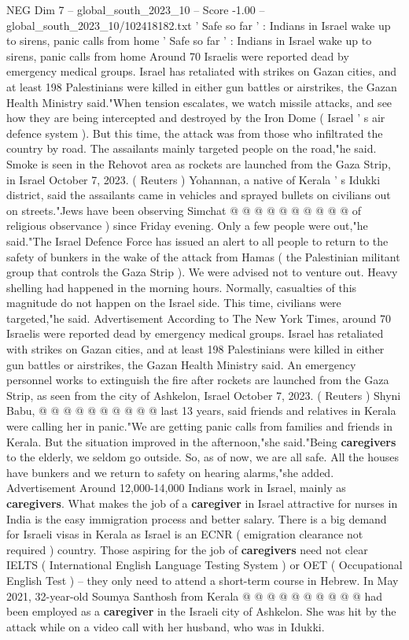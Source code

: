 \begin{textsample}{NEG Dim 7 – global\_south\_2023\_10 – Score -1.00 – global\_south\_2023\_10/102418182.txt}  \label{ex:f7_neg_070}
' Safe so far ' : Indians in Israel wake up to sirens, panic calls from home ' Safe so far ' : Indians in Israel wake up to sirens, panic calls from home Around 70 Israelis were reported dead by emergency medical groups.
Israel has retaliated with strikes on Gazan cities, and at least 198 Palestinians were killed in either gun battles or airstrikes, the Gazan Health Ministry said."When tension escalates, we watch missile attacks, and see how they are being intercepted and destroyed by the Iron Dome ( Israel ' s air defence system ).
But this time, the attack was from those who infiltrated the country by road.
The assailants mainly targeted people on the road,"he said.
Smoke is seen in the Rehovot area as rockets are launched from the Gaza Strip, in Israel October 7, 2023. ( Reuters ) Yohannan, a native of Kerala ' s Idukki district, said the assailants came in vehicles and sprayed bullets on civilians out on streets."Jews have been observing Simchat @ @ @ @ @ @ @ @ @ @ of religious observance ) since Friday evening.
Only a few people were out,"he said."The Israel Defence Force has issued an alert to all people to return to the safety of bunkers in the wake of the attack from Hamas ( the Palestinian militant group that controls the Gaza Strip ).
We were advised not to venture out.
Heavy shelling had happened in the morning hours.
Normally, casualties of this magnitude do not happen on the Israel side.
This time, civilians were targeted,"he said.
Advertisement According to The New York Times, around 70 Israelis were reported dead by emergency medical groups.
Israel has retaliated with strikes on Gazan cities, and at least 198 Palestinians were killed in either gun battles or airstrikes, the Gazan Health Ministry said.
An emergency personnel works to extinguish the fire after rockets are launched from the Gaza Strip, as seen from the city of Ashkelon, Israel October 7, 2023. ( Reuters ) Shyni Babu, @ @ @ @ @ @ @ @ @ @ last 13 years, said friends and relatives in Kerala were calling her in panic."We are getting panic calls from families and friends in Kerala.
But the situation improved in the afternoon,"she said."Being \textbf{caregivers} to the elderly, we seldom go outside.
So, as of now, we are all safe.
All the houses have bunkers and we return to safety on hearing alarms,"she added.
Advertisement Around 12,000-14,000 Indians work in Israel, mainly as \textbf{caregivers}.
What makes the job of a \textbf{caregiver} in Israel attractive for nurses in India is the easy immigration process and better salary.
There is a big demand for Israeli visas in Kerala as Israel is an ECNR ( emigration clearance not required ) country.
Those aspiring for the job of \textbf{caregivers} need not clear IELTS ( International English Language Testing System ) or OET ( Occupational English Test ) -- they only need to attend a short-term course in Hebrew.
In May 2021, 32-year-old Soumya Santhosh from Kerala @ @ @ @ @ @ @ @ @ @ had been employed as a \textbf{caregiver} in the Israeli city of Ashkelon.
She was hit by the attack while on a video call with her husband, who was in Idukki.

\end{textsample}
